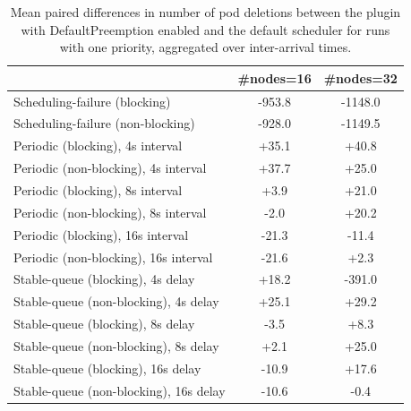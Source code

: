\begin{table}[t]
\tiny
\setlength{\tabcolsep}{1.2pt}
\renewcommand{\arraystretch}{1.12}
\centering
\caption{Mean paired differences in number of pod deletions between the plugin with DefaultPreemption enabled and the default scheduler for runs with one priority, aggregated over inter-arrival times.}
\label{tab:deletions-defpreempt1-prio1-std0-agg-arrival}
\begin{tabular}{l c c}
\toprule
 & \#nodes=16 & \#nodes=32 \\
\midrule
Scheduling-failure (blocking) & -953.8 & -1148.0 \\
Scheduling-failure (non-blocking) & -928.0 & -1149.5 \\
Periodic (blocking), 4s interval & +35.1 & +40.8 \\
Periodic (non-blocking), 4s interval & +37.7 & +25.0 \\
Periodic (blocking), 8s interval & +3.9 & +21.0 \\
Periodic (non-blocking), 8s interval & -2.0 & +20.2 \\
Periodic (blocking), 16s interval & -21.3 & -11.4 \\
Periodic (non-blocking), 16s interval & -21.6 & +2.3 \\
Stable-queue (blocking), 4s delay & +18.2 & -391.0 \\
Stable-queue (non-blocking), 4s delay & +25.1 & +29.2 \\
Stable-queue (blocking), 8s delay & -3.5 & +8.3 \\
Stable-queue (non-blocking), 8s delay & +2.1 & +25.0 \\
Stable-queue (blocking), 16s delay & -10.9 & +17.6 \\
Stable-queue (non-blocking), 16s delay & -10.6 & -0.4 \\
\bottomrule
\end{tabular}
\end{table}
